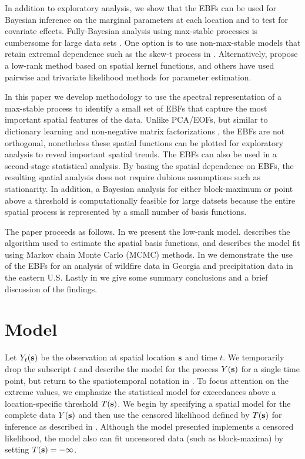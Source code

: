 \documentclass[11pt]{article}
\begin{document}
In addition to exploratory analysis, we show that the EBFs can be used for Bayesian inference on the marginal parameters at each location and to test for covariate effects.
Fully-Bayesian analysis using max-stable processes is cumbersome for large data sets \citep{Wadsworth2014,Thibaud2013a}.
One option is to use non-max-stable models that retain extremal dependence such as the skew-t process in \citep{Morris2016}.
Alternatively, \citet{Reich2012} propose a low-rank method based on spatial kernel functions, and others have used pairwise \citep{Padoan2010,Huser2014} and trivariate \citep{Genton2011} likelihood methods for parameter estimation.

In this paper we develop methodology to use the spectral representation of a max-stable process to identify a small set of EBFs that capture the most important spatial features of the data.
Unlike PCA/EOFs, but similar to dictionary learning \citep{Mairal2014} and non-negative matrix factorizations \citep{Lee1999}, the EBFs are not orthogonal, nonetheless these spatial functions can be plotted for exploratory analysis to reveal important spatial trends.
The EBFs can also be used in a second-stage statistical analysis.
By basing the spatial dependence on EBFs, the resulting spatial analysis does not require dubious assumptions such as stationarity.
In addition, a Bayesian analysis for either block-maximum or point above a threshold is computationally feasible for large datsets because the entire spatial process is represented by a small number of basis functions.

The paper proceeds as follows. In  we present the low-rank model.  describes the algorithm used to estimate the spatial basis functions, and  describes the model fit using Markov chain Monte Carlo (MCMC) methods. In  we demonstrate the use of the EBFs for an analysis of wildfire data in Georgia and precipitation data in the eastern U.S. Lastly in  we give some summary conclusions and a brief discussion of the findings.

\section{Model}\label{ebs:model}

Let $Y_{t}(\mbox{\bf s})$ be the observation at spatial location $\mbox{\bf s}$ and time $t$.  We temporarily drop the subscript $t$ and describe the model for the process $Y(\mbox{\bf s})$ for a single time point, but return to the spatiotemporal notation in .
To focus attention on the extreme values, we emphasize the statistical model for exceedances above a location-specific threshold $T(\mbox{\bf s})$.
We begin by specifying a spatial model for the complete data $Y(\mbox{\bf s})$ and then use the censored likelihood defined by $T(\mbox{\bf s})$ for inference as described in .
Although the model presented implements a censored likelihood, the model also can fit uncensored data (such as block-maxima) by setting $T(\mbox{\bf s}) = -\infty$.
\end{document}
